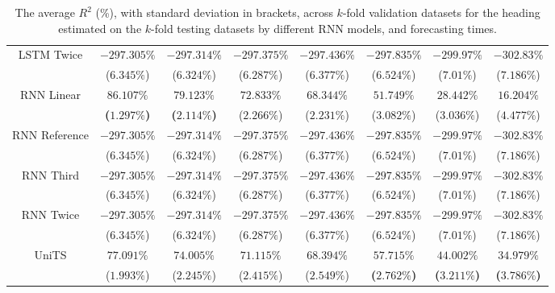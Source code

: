 \begin{table}[!ht]
{\begin{tabular}{|c|c|c|c|c|c|c|c|}
			\multirow{2}{*}{LSTM Twice} & $-297.305\%$ & $-297.314\%$ & $-297.375\%$ & $-297.436\%$ & $-297.835\%$ & $-299.97\%$ & $-302.83\%$ \\
			 & ($6.345\%$) & ($6.324\%$) & ($6.287\%$) & ($6.377\%$) & ($6.524\%$) & ($7.01\%$) & ($7.186\%$) \\ \hline
			\multirow{2}{*}{RNN Linear} & $\mathbf{86.107\%}$ & $\mathbf{79.123\%}$ & $72.833\%$ & $68.344\%$ & $51.749\%$ & $28.442\%$ & $16.204\%$ \\
			 & \textbf{(}$\mathbf{1.297\%}$\textbf{)} & \textbf{(}$\mathbf{2.114\%}$\textbf{)} & ($2.266\%$) & ($2.231\%$) & ($3.082\%$) & ($3.036\%$) & ($4.477\%$) \\ \hline
			\multirow{2}{*}{RNN Reference} & $-297.305\%$ & $-297.314\%$ & $-297.375\%$ & $-297.436\%$ & $-297.835\%$ & $-299.97\%$ & $-302.83\%$ \\
			 & ($6.345\%$) & ($6.324\%$) & ($6.287\%$) & ($6.377\%$) & ($6.524\%$) & ($7.01\%$) & ($7.186\%$) \\ \hline
			\multirow{2}{*}{RNN Third} & $-297.305\%$ & $-297.314\%$ & $-297.375\%$ & $-297.436\%$ & $-297.835\%$ & $-299.97\%$ & $-302.83\%$ \\
			 & ($6.345\%$) & ($6.324\%$) & ($6.287\%$) & ($6.377\%$) & ($6.524\%$) & ($7.01\%$) & ($7.186\%$) \\ \hline
			\multirow{2}{*}{RNN Twice} & $-297.305\%$ & $-297.314\%$ & $-297.375\%$ & $-297.436\%$ & $-297.835\%$ & $-299.97\%$ & $-302.83\%$ \\
			 & ($6.345\%$) & ($6.324\%$) & ($6.287\%$) & ($6.377\%$) & ($6.524\%$) & ($7.01\%$) & ($7.186\%$) \\ \hline
			\multirow{2}{*}{UniTS} & $77.091\%$ & $74.005\%$ & $71.115\%$ & $68.394\%$ & $\mathbf{57.715\%}$ & $\mathbf{44.002\%}$ & $\mathbf{34.979\%}$ \\
			 & ($1.993\%$) & ($2.245\%$) & ($2.415\%$) & ($2.549\%$) & \textbf{(}$\mathbf{2.762\%}$\textbf{)} & \textbf{(}$\mathbf{3.211\%}$\textbf{)} & \textbf{(}$\mathbf{3.786\%}$\textbf{)} \\ \hline
		\end{tabular}
	}
	\caption{The average $R^{2}$ (\%), with standard deviation in brackets, across $k$-fold validation datasets for the heading estimated on the $k$-fold testing datasets by different RNN models, and forecasting times.}
	\label{tab:all_direction_R2}
\end{table}

